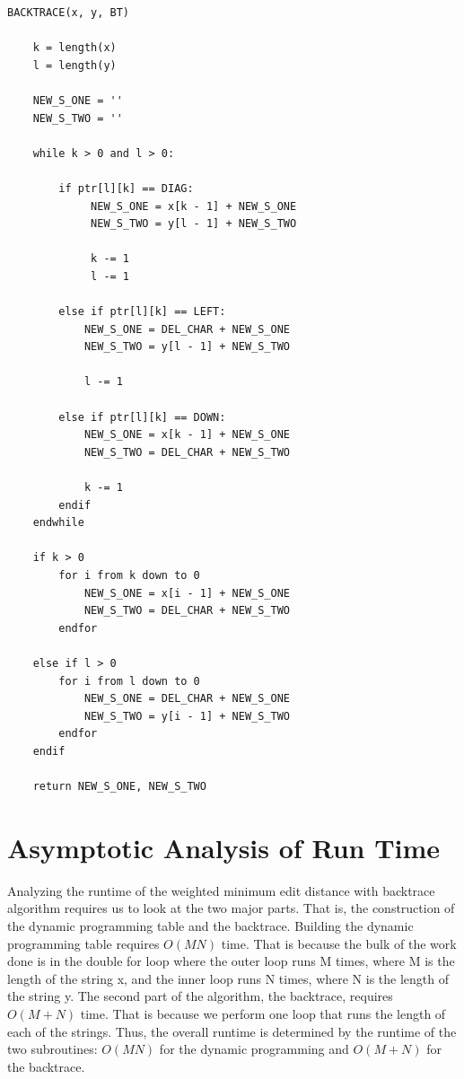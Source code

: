 \documentclass[10pt, onecolumn, draftclsnofoot, letterpaper, compsoc]{IEEEtran}
\begin{document}
\newpage

\begin{lstlisting}
BACKTRACE(x, y, BT)

	k = length(x)
	l = length(y)

	NEW_S_ONE = ''
	NEW_S_TWO = ''

	while k > 0 and l > 0:

        if ptr[l][k] == DIAG:
             NEW_S_ONE = x[k - 1] + NEW_S_ONE
             NEW_S_TWO = y[l - 1] + NEW_S_TWO

             k -= 1
             l -= 1

        else if ptr[l][k] == LEFT:
            NEW_S_ONE = DEL_CHAR + NEW_S_ONE
            NEW_S_TWO = y[l - 1] + NEW_S_TWO

            l -= 1

        else if ptr[l][k] == DOWN:
            NEW_S_ONE = x[k - 1] + NEW_S_ONE
            NEW_S_TWO = DEL_CHAR + NEW_S_TWO

            k -= 1
		endif
	endwhile

	if k > 0
		for i from k down to 0
			NEW_S_ONE = x[i - 1] + NEW_S_ONE
			NEW_S_TWO = DEL_CHAR + NEW_S_TWO
		endfor

	else if l > 0
		for i from l down to 0
			NEW_S_ONE = DEL_CHAR + NEW_S_ONE
			NEW_S_TWO = y[i - 1] + NEW_S_TWO
		endfor
	endif

	return NEW_S_ONE, NEW_S_TWO
\end{lstlisting}

\newpage

\section{Asymptotic Analysis of Run Time}

Analyzing the runtime of the weighted minimum edit distance with backtrace algorithm
requires us to look at the two major parts. That is, the construction of the
dynamic programming table and the backtrace. Building the dynamic programming table
requires \begin{math}O(MN)\end{math} time. That is because the bulk of the work done
is in the double for loop where the outer loop runs M times, where M is the length
of the string x, and the inner loop runs N times, where N is the length of the string
y. The second part of the algorithm, the backtrace, requires \begin{math}O(M+N)\end{math}
time. That is because we perform one loop that runs the length of each of the strings.
Thus, the overall runtime is determined by the runtime of the two subroutines:
\begin{math}O(MN)\end{math} for the dynamic programming and \begin{math}O(M+N)\end{math}
for the backtrace.
\end{document}
